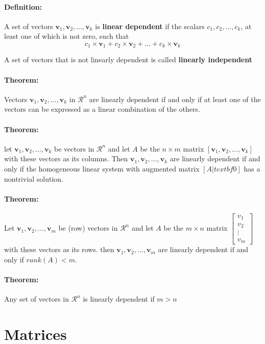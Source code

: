 \documentclass[12pt]{article}
\newenvironment{theorem}{\paragraph{Theorem:\hfill}}{\hfill}
\newenvironment{definition}{\paragraph{Definition: }}{\hfill}
\begin{document}
\begin{definition}
	\hfill
	
	A set of vectors $\textbf{v}_1, \textbf{v}_2, \dots, \textbf{v}_k$ is \textbf{linear dependent} if the scalars $c_1, c_2, \dots, c_k$, at least one of which is not zero, such that
	\[
		c_1 \times \textbf{v}_1 + c_2 \times \textbf{v}_2 + \dots + c_k \times \textbf{v}_k
	\]
	
	A set of vectors that is not linearly dependent is called \textbf{linearly independent}
\end{definition}

\begin{theorem}
	Vectors $\textbf{v}_1, \textbf{v}_2, \dots, \textbf{v}_k$ in $\mathcal{R}^n$ are linearly dependent if and only if at least one of the vectors can be expressed as a linear combination of the others.
\end{theorem}

\begin{theorem}
	let  $\textbf{v}_1, \textbf{v}_2, \dots, \textbf{v}_k$ be vectors in $\mathcal{R}^n$ and let $A$ be the $n \times m$ matrix $[\textbf{v}_1, \textbf{v}_2, \dots, \textbf{v}_k]$ with these vectors as its columns. Then $\textbf{v}_1, \textbf{v}_2, \dots, \textbf{v}_k$ are linearly dependent if and only if the homogeneous linear system with augmented matrix $[A| textbf{0}]$ has a nontrivial solution.
\end{theorem}

\begin{theorem}
	Let $\textbf{v}_1, \textbf{v}_2, \dots, \textbf{v}_m$ be (row) vectors in $\mathcal{R}^n$ and let $A$ be the $m \times n$ matrix 
	$
		\begin{bmatrix}
		v_{1}\\
		v_{2}\\
		\vdots \\
		v_{m}
		\end{bmatrix}
	$ with these vectors as its rows. then $\textbf{v}_1, \textbf{v}_2, \dots, \textbf{v}_m$ are linearly dependent if and only if $rank(A) < m$.
\end{theorem}

\begin{theorem}
	Any set of vectors in $\mathcal{R}^n$ is linearly dependent if $m > n$
\end{theorem}

\newpage

\section{Matrices}
\end{document}
